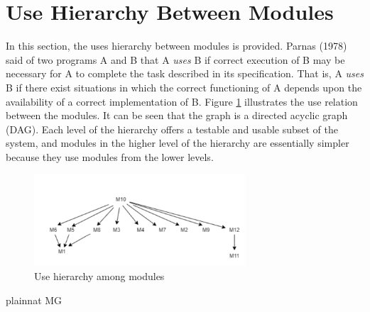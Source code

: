 \documentclass[12pt, titlepage]{article}
\begin{document}
\section{Use Hierarchy Between Modules} \label{SecUse}

In this section, the uses hierarchy between modules is
provided. Parnas (1978) said of two programs A and B that A {\em uses} B if
correct execution of B may be necessary for A to complete the task described in
its specification. That is, A {\em uses} B if there exist situations in which
the correct functioning of A depends upon the availability of a correct
implementation of B.  Figure \ref{FigUH} illustrates the use relation between
the modules. It can be seen that the graph is a directed acyclic graph
(DAG). Each level of the hierarchy offers a testable and usable subset of the
system, and modules in the higher level of the hierarchy are essentially simpler
because they use modules from the lower levels.

\begin{figure}[H]
\centering
\includegraphics[width=0.7\textwidth]{usesHeirarchy.png}
\caption{Use hierarchy among modules}
\label{FigUH}
\end{figure}


 {plainnat}
 {MG}
\end{document}
